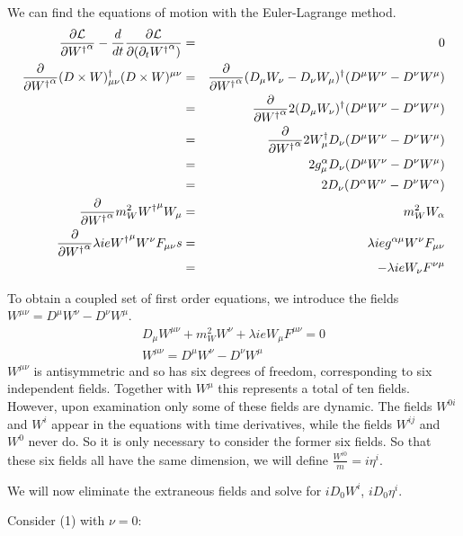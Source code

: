 We can find the equations of motion with the Euler-Lagrange method.
\begin{eqnarray*} \frac{\partial  \mathcal{L}}{\partial {W^\dagger}^\alpha} - \frac{d}{dt} \frac{\partial \mathcal{L}} {\partial (\partial_t {W^\dagger}^ \alpha)} 
	&=& 0	\\
\frac{ \partial}{\partial  {W^\dagger}^\alpha} (D \times W)^\dagger_{\mu \nu} (D \times W)^{\mu \nu}
	&=&	\frac{ \partial}{\partial  {W^\dagger}^\alpha}
				(D_\mu W_\nu - D_\nu W_\mu)^\dagger(D^\mu W^\nu - D^\nu W^\mu) \\
	&=&	\frac{ \partial}{\partial  {W^\dagger}^\alpha}
				2(D_\mu W_\nu)^\dagger(D^\mu W^\nu - D^\nu W^\mu) \\
	&=& 	\frac{ \partial}{\partial  {W^\dagger}^\alpha}
				2W^\dagger_\mu D_\nu (D^\mu W^\nu - D^\nu W^\mu) \\
	&=& 	2g_\mu^\alpha D_\nu(D^\mu W^\nu - D^\nu W^\mu) \\
	&=& 	2 D_\nu(D^\alpha W^\nu - D^\nu W^\alpha) \\ 
\frac{ \partial}{\partial  {W^\dagger}^\alpha}  m_W^2 {W^\dagger}^\mu W_\mu
	&=&	m_W^2 W_\alpha	\\
\frac{ \partial}{\partial  {W^\dagger}^\alpha} \lambda i e {W^\dagger}^\mu W^\nu F_{\mu \nu}s
	&=&	\lambda i e g^{\alpha \mu} W^\nu F_{\mu \nu}	\\
	&=&	- \lambda i e W_\nu F^{\nu \mu}
\end {eqnarray*}


To obtain a coupled set of first order equations, we introduce the fields $W^{\mu \nu} = D^\mu W^\nu - D^\nu W^\mu$.
\begin{eqnarray}
	D_\mu W^{\mu \nu} + m_W^2 W^\nu + \lambda i e W_\mu F^{\mu \nu} = 0	\\
	W^{\mu \nu} = D^\mu W^\nu - D^\nu W^\mu	
\end{eqnarray}
$W^{\mu\nu}$ is antisymmetric and so has six degrees of freedom, corresponding to six independent fields.  Together with $W^\mu$ this represents a total of ten fields.  However, upon examination only some of these fields are dynamic.  The  fields $W^{0i}$ and $W^{i}$ appear in the equations with time derivatives, while the fields $W^{ij}$ and $W^0$ never do.  So it is only necessary to consider the former six fields.  So that these six fields all have the same dimension, we will define $\frac{W^{i0}}{m} = i \eta^i$.

We will now eliminate the extraneous fields and solve for $iD_0 W^i$, $iD_0 \eta^i$.

Consider (1) with $\nu=0$:

